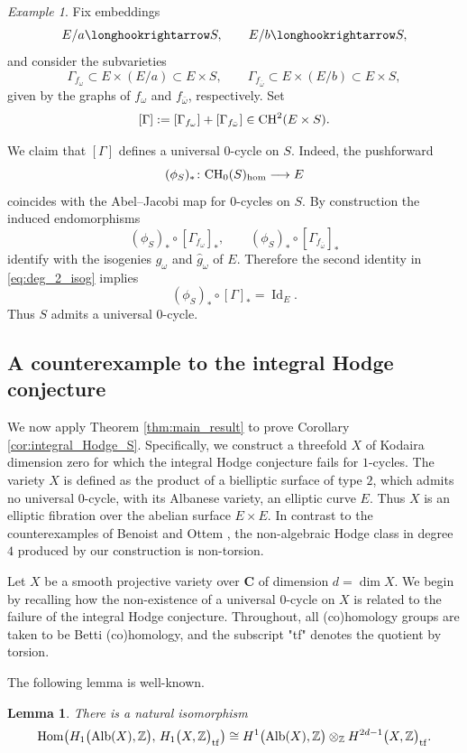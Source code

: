 \documentclass[11pt,letterpaper]{amsart}
\newcommand{\Alb}{\textnormal{Alb}}
\newcommand{\CH}{\textnormal{CH}}
\numberwithin{equation}{section}
\newtheorem{lemma}[theorem]{Lemma}
\theoremstyle{definition}
\theoremstyle{remark}
\newtheorem{example}[theorem]{Example}
\newcommand{\Z}{\mathbb{Z}}
\newcommand{\bbC}{\mathbf{C}}
\DeclareMathOperator{\Hom}{Hom}
\DeclareMathOperator{\Id}{Id}
\begin{document}
\begin{example}
Fix embeddings
$$
E/a\longhookrightarrow S,
\qquad
E/b\longhookrightarrow S,
$$
and consider the subvarieties
$$
\Gamma_{f_\omega}\subset E\times (E/a)\subset E\times S,
\qquad
\Gamma_{f_{\bar\omega}}\subset E\times (E/b)\subset E\times S,
$$
given by the graphs of $f_\omega$ and $f_{\bar\omega}$, respectively. Set
$$
[\Gamma]:=[\Gamma_{f_\omega}]+[\Gamma_{f_{\bar\omega}}]\in\CH^2(E\times S).
$$

We claim that $[\Gamma]$ defines a universal $0$-cycle on $S$. Indeed, the pushforward
$$
(\phi_S)_*\colon \CH_0(S)_{\hom}\longrightarrow E
$$
coincides with the Abel--Jacobi map for $0$-cycles on $S$. By construction the induced endomorphisms
$$
(\phi_S)_*\circ[\Gamma_{f_\omega}]_*,
\qquad
(\phi_S)_*\circ[\Gamma_{f_{\bar\omega}}]_*
$$
identify with the isogenies $g_\omega$ and $\hat g_\omega$ of $E$. Therefore the second identity in \eqref{eq:deg_2_isog} implies
$$
(\phi_S)_*\circ[\Gamma]_\ast=\Id_E.
$$
Thus $S$ admits a universal $0$-cycle.
\end{example}

\subsection{A counterexample to the integral Hodge conjecture} We now apply Theorem \ref{thm:main_result} to prove Corollary \ref{cor:integral_Hodge_S}. Specifically, we construct a threefold $X$ of Kodaira dimension zero for which the integral Hodge conjecture fails for $1$-cycles. The variety $X$ is defined as the product of a bielliptic surface of type $2$, which admits no universal $0$-cycle, with its Albanese variety, an elliptic curve $E$. Thus $X$ is an elliptic fibration over the abelian surface $E \times E$. In contrast to the counterexamples of Benoist and Ottem \cite{benoist-ottem}, the non-algebraic Hodge class in degree $4$ produced by our construction is non-torsion.\par
Let $X$ be a smooth projective variety over $\bbC$ of dimension $d= \dim X$. We begin by recalling how the non-existence of a universal $0$-cycle on $X$ is related to the failure of the integral Hodge conjecture. Throughout, all (co)homology groups are taken to be Betti (co)homology, and the subscript "tf" denotes the quotient by torsion.\par

The following lemma is well-known.
\begin{lemma}\label{lem:natural_identification} There is a natural isomorphism 
\begin{equation}\label{eq:natural_identification}
    \Hom\bigl(H_{1}\bigl(\Alb(X),\Z\bigr),\,H_{1}\bigl(X,\Z\bigr)_{\mathrm{tf}}\bigr)\cong H^{1}\bigl(\Alb(X),\Z\bigr)\otimes_{\Z} H^{2d-1}\bigl(X,\Z\bigr)_{\mathrm{tf}}.
\end{equation}
\end{lemma}
\end{document}
